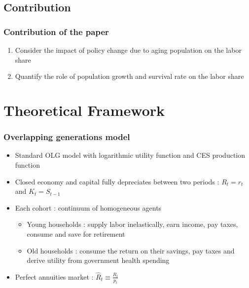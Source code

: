 \documentclass{beamer}
\begin{document}
		\subsection{Contribution}
		\begin{frame}\frametitle{Contribution of the paper}
			\begin{enumerate}
				[default]
				\item Consider the impact of policy change due to aging population on the labor share
				\vspace{1em}
				\item Quantify the role of population growth and survival rate on the labor share
			\end{enumerate}
		\end{frame}
	
	\section{Theoretical Framework}
		\begin{frame}[label = olgmodel]\frametitle{Overlapping generations model}
			\begin{itemize}
				\item Standard OLG model with logarithmic utility function and CES production function \hyperlink{preferences<1>}{}
				\item Closed economy and capital fully depreciates between two periods : $R_t = r_t$ and $K_t = S_{t-1}$
				\item Each cohort : continuum of homogeneous agents
				\begin{itemize}
					\item Young households : supply labor inelastically, earn income, pay taxes, consume and save for retirement
					\item Old households : consume the return on their savings, pay taxes and derive utility from government health spending
				\end{itemize}
				\item Perfect annuities market : $\hat{R}_t \equiv \frac{R_t}{p_t}$
			\end{itemize}
		\end{frame}
\end{document}

